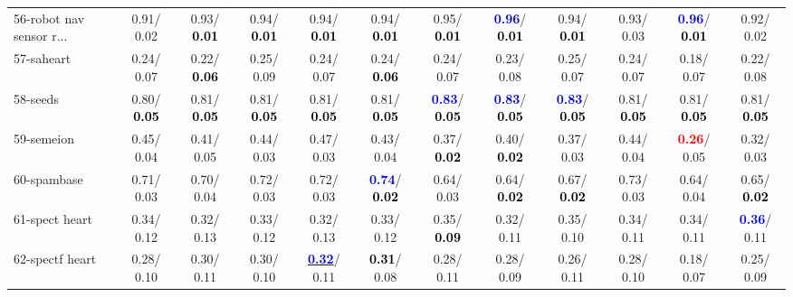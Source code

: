 \begin{table}[h]
\begin{center}
{\begin{tabular}{lc|c|c|c|c|c|c|c|c|c|c}
56-robot nav sensor r... &   0.91/  0.02 &   0.93/\textcolor{black}{\textbf{  0.01}} &   0.94/\textcolor{black}{\textbf{  0.01}} &   0.94/\textcolor{black}{\textbf{  0.01}} &   0.94/\textcolor{black}{\textbf{  0.01}} &   0.95/\textcolor{black}{\textbf{  0.01}} & \textcolor{blue}{\textbf{  0.96}}/\textcolor{black}{\textbf{  0.01}} &   0.94/\textcolor{black}{\textbf{  0.01}} &   0.93/  0.03 & \textcolor{blue}{\textbf{  0.96}}/\textcolor{black}{\textbf{  0.01}} &   0.92/  0.02 \\
57-saheart &   0.24/  0.07 &   0.22/\textcolor{black}{\textbf{  0.06}} &   0.25/  0.09 &   0.24/  0.07 &   0.24/\textcolor{black}{\textbf{  0.06}} &   0.24/  0.07 &   0.23/  0.08 &   0.25/  0.07 &   0.24/  0.07 &   0.18/  0.07 &   0.22/  0.08 \\
58-seeds &   0.80/\textcolor{black}{\textbf{  0.05}} &   0.81/\textcolor{black}{\textbf{  0.05}} &   0.81/\textcolor{black}{\textbf{  0.05}} &   0.81/\textcolor{black}{\textbf{  0.05}} &   0.81/\textcolor{black}{\textbf{  0.05}} & \textcolor{blue}{\textbf{  0.83}}/\textcolor{black}{\textbf{  0.05}} & \textcolor{blue}{\textbf{  0.83}}/\textcolor{black}{\textbf{  0.05}} & \textcolor{blue}{\textbf{  0.83}}/\textcolor{black}{\textbf{  0.05}} &   0.81/\textcolor{black}{\textbf{  0.05}} &   0.81/\textcolor{black}{\textbf{  0.05}} &   0.81/\textcolor{black}{\textbf{  0.05}} \\
59-semeion &   0.45/  0.04 &   0.41/  0.05 &   0.44/  0.03 &   0.47/  0.03 &   0.43/  0.04 &   0.37/\textcolor{black}{\textbf{  0.02}} &   0.40/\textcolor{black}{\textbf{  0.02}} &   0.37/  0.03 &   0.44/  0.04 & \textcolor{red}{\textbf{  0.26}}/  0.05 &   0.32/  0.03 \\
60-spambase &   0.71/  0.03 &   0.70/  0.04 &   0.72/  0.03 &   0.72/  0.03 & \textcolor{blue}{\textbf{  0.74}}/\textcolor{black}{\textbf{  0.02}} &   0.64/  0.03 &   0.64/\textcolor{black}{\textbf{  0.02}} &   0.67/\textcolor{black}{\textbf{  0.02}} &   0.73/  0.03 &   0.64/  0.04 &   0.65/\textcolor{black}{\textbf{  0.02}} \\ \hline
61-spect heart &   0.34/  0.12 &   0.32/  0.13 &   0.33/  0.12 &   0.32/  0.13 &   0.33/  0.12 &   0.35/\textcolor{black}{\textbf{  0.09}} &   0.32/  0.11 &   0.35/  0.10 &   0.34/  0.11 &   0.34/  0.11 & \textcolor{blue}{\textbf{  0.36}}/  0.11 \\
62-spectf heart &   0.28/  0.10 &   0.30/  0.11 &   0.30/  0.10 & \underline{\textcolor{blue}{\textbf{  0.32}}}/  0.11 & \textcolor{black}{\textbf{  0.31}}/  0.08 &   0.28/  0.11 &   0.28/  0.09 &   0.26/  0.11 &   0.28/  0.10 &   0.18/  0.07 &   0.25/  0.09 \\

\end{tabular}}
\end{center}
\end{table}

